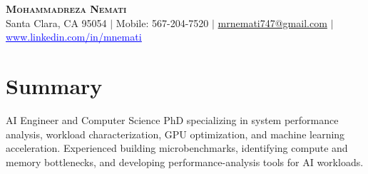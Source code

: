 \documentclass[letterpaper,13pt]{article}
\begin{document}
\begin{center}
    \textbf{\LARGE \scshape Mohammadreza Nemati} \\ \vspace{1pt}
    \small Santa Clara, CA 95054 $|$ Mobile: 567-204-7520 $|$
    \href{mailto:mrnemati747@gmail.com}{mrnemati747@gmail.com} $|$
    \href{https://www.linkedin.com/in/mnemati/}{\textcolor{blue}{\underline{www.linkedin.com/in/mnemati}}}
\end{center}

\section{Summary}
\small{AI Engineer and Computer Science PhD specializing in system performance analysis, workload characterization, GPU optimization, and machine learning acceleration. Experienced building microbenchmarks, identifying compute and memory bottlenecks, and developing performance-analysis tools for AI workloads.}
\vspace{0.05cm}
\end{document}
